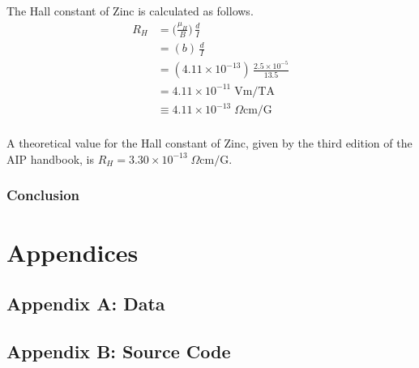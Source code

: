\documentclass[a4paper]{article}
\begin{document}
The Hall constant of Zinc is calculated as follows.
\begin{align*}
R_H &= \big( \frac{\mu_H}{B} \big) \, \frac{d}{I} \\
    &= (b) \, \frac{d}{I} \\
    &= (4.11 \times 10^{-13}) \, \frac{2.5 \times 10^{-5}}{13.5} \\
    &= 4.11 \times 10^{-11} \; \text{Vm/TA} \\
    &\equiv 4.11 \times 10^{-13} \; \Omega \text{cm/G} \\
\end{align*}

A theoretical value for the Hall constant of Zinc, given by the third edition of the AIP handbook, is $R_H = 3.30 \times 10^{-13} \; \Omega \text{cm/G}$.




\subsubsection{Conclusion}

\section{Appendices}

\subsection{Appendix A: Data}

\subsection{Appendix B: Source Code}
\end{document}
